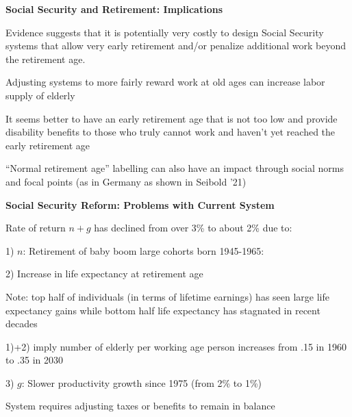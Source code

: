 \documentclass[landscape]{slides}
\begin{document}
\begin{slide}
\begin{center}
{\bf Social Security and Retirement: Implications}
\end{center}

Evidence suggests that it is potentially very costly to design Social Security systems that
allow very early retirement and/or penalize additional work beyond the retirement age.

Adjusting systems to more fairly reward work at old ages can increase labor supply of elderly

It seems better to have an early retirement age that is not too low and provide disability benefits to those who truly cannot work and haven't yet reached the early retirement age


``Normal retirement age'' labelling can also have an impact through social norms and focal points (as in Germany as shown in Seibold '21)


\end{slide}


\begin{slide}

\end{slide}




\begin{slide}
\begin{center}
{\bf Social Security Reform: Problems with Current System}
\end{center}

Rate of return $n+g$ has declined from over 3\% to about 2\% due
to:

1) $n$: Retirement of baby boom large cohorts born 1945-1965:

2) Increase in life expectancy at retirement age

\small
Note: top half of individuals  (in terms
of lifetime earnings)
has seen large life expectancy gains while bottom half life expectancy
has stagnated in recent decades

\normalsize

1)+2) imply number of elderly per working age person increases from .15
in 1960 to .35 in 2030

3) $g$: Slower productivity growth since 1975 (from 2\% to 1\%)

System requires adjusting taxes or benefits to remain in balance

\end{slide}
\end{document}
